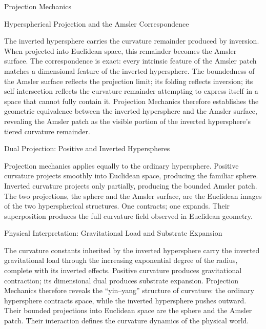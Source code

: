 \documentclass[final,onefignum,onetabnum]{siamart}
\begin{document}
\begin{section}{Projection Mechanics}
\begin{subsection}{Hyperspherical Projection and the Amsler Correspondence}

The inverted hypersphere carries the curvature remainder produced by inversion. When projected into Euclidean space, this remainder becomes the Amsler surface. The correspondence is exact: every intrinsic feature of the Amsler patch matches a dimensional feature of the inverted hypersphere. The boundedness of the Amsler surface reflects the projection limit; its folding reflects inversion; its self intersection reflects the curvature remainder attempting to express itself in a space that cannot fully contain it. Projection Mechanics therefore establishes the geometric equivalence between the inverted hypersphere and the Amsler surface, revealing the Amsler patch as the visible portion of the inverted hypersphere’s tiered curvature remainder.
\end{subsection}

\begin{subsection}{Dual Projection: Positive and Inverted Hyperspheres}

Projection mechanics applies equally to the ordinary hypersphere. Positive curvature projects smoothly into Euclidean space, producing the familiar sphere. Inverted curvature projects only partially, producing the bounded Amsler patch. The two projections, the sphere and the Amsler surface, are the Euclidean images of the two hyperspherical structures. One contracts; one expands. Their superposition produces the full curvature field observed in Euclidean geometry.
\end{subsection}

\begin{subsection}{Physical Interpretation: Gravitational Load and Substrate Expansion}

The curvature constants inherited by the inverted hypersphere carry the inverted gravitational load through the increasing exponential degree of the radius, complete with its inverted effects. Positive curvature produces gravitational contraction; its dimensional dual produces substrate expansion. Projection Mechanics therefore reveals the ``yin–yang'' structure of curvature: the ordinary hypersphere contracts space, while the inverted hypersphere pushes outward. Their bounded projections into Euclidean space are the sphere and the Amsler patch. Their interaction defines the curvature dynamics of the physical world.


\end{subsection}
\end{section}
\end{document}
